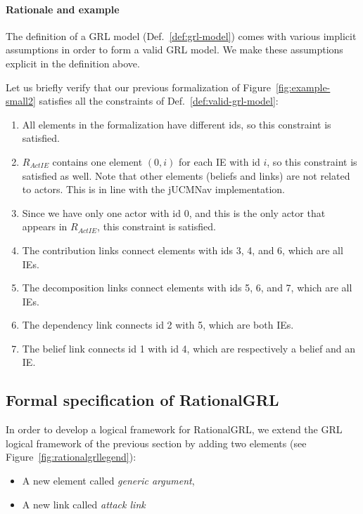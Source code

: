 \paragraph{Rationale and example} The definition of a GRL model (Def.~\ref{def:grl-model}) comes with various implicit assumptions in order to form a valid GRL model. We make these assumptions explicit in the definition above.

Let us briefly verify that our previous formalization of Figure~\ref{fig:example-small2} satisfies all the constraints of Def.~\ref{def:valid-grl-model}:
\begin{enumerate}
\item All elements in the formalization have different ids, so this constraint is satisfied.
\item $R_{ActIE}$ contains one element $(0,i)$ for each IE with id $i$, so this constraint is satisfied as well. Note that other elements (beliefs and links) are not related to actors. This is in line with the jUCMNav implementation.
\item Since we have only one actor with id 0, and this is the only actor that appears in $R_{ActIE}$, this constraint is satisfied.
\item The contribution links connect elements with ids 3, 4, and 6, which are all IEs.
\item The decomposition links connect elements with ids 5, 6, and 7, which are all IEs.
\item The dependency link connects id 2 with 5, which are both IEs.
\item The belief link connects id 1 with id 4, which are respectively a belief and an IE.
\end{enumerate}

\subsection{Formal specification of RationalGRL}
\label{sect:formalframework:rationalgrl}

In order to develop a logical framework for RationalGRL, we extend the GRL logical framework of the previous section by adding two elements (see Figure~\ref{fig:rationalgrllegend}):
\begin{itemize}
\item A new element called \emph{generic argument},
\item A new link called \emph{attack link}
\end{itemize}

